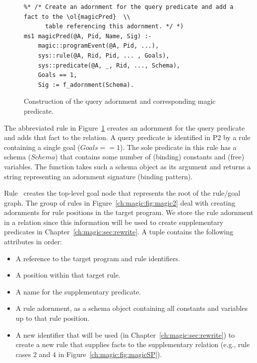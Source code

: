 \begin{figure}[!t]
\ssp
\centering
\begin{lstlisting}
%* /* Create an adornment for the query predicate and add a fact to the \ol{magicPred}  \\
      table referencing this adornment. */ *)
ms1 magicPred(@A, Pid, Name, Sig) :-
    magic::programEvent(@A, Pid, ...),
    sys::rule(@A, Rid, Pid, ... , Goals),
    sys::predicate(@A, _, Rid, ..., Schema),
    Goals == 1,
    Sig := f_adornment(Schema).
\end{lstlisting}
\caption{\label{ch:magic:fig:magic1}Construction of the query adornment and corresponding magic predicate.}
\end{figure}

The abbreviated rule in Figure~\ref{ch:magic:fig:magic1} creates an adornment
for the query predicate and adds that fact to the  relation.  A
query predicate is identified in P2 by a rule containing a single goal ($Goals
== 1$).  The sole predicate in this rule has a schema ($Schema$) that contains
some number of (binding) constants and (free) variables.  The function  
takes such a schema object as its argument and returns a string
representing an adornment signature (binding pattern).

Rule~ creates the top-level goal node that represents the root of the
rule/goal graph.  The group of rules in Figure~\ref{ch:magic:fig:magic2} deal
with creating adornments for rule positions in the target program.  We store
the rule adornment in a  relation since this information will be used
to create supplementary predicates in Chapter~\ref{ch:magic:sec:rewrite}.  A
 tuple contains the following attributes in order:
\begin{itemize}
   \ssp
  \item A reference to the target program and rule identifiers. 
  \item A position within that target rule.
  \item A name for the supplementary predicate.
  \item A rule adornment, as a schema object containing all constants and variables up to that rule position.
  \item A new identifier that will be used (in Chapter~\ref{ch:magic:sec:rewrite}) to create 
    a new rule that supplies facts to the supplementary relation (e.g., rule cases $2$ and $4$ 
    in Figure~\ref{ch:magic:fig:magicSP}).
\end{itemize}

